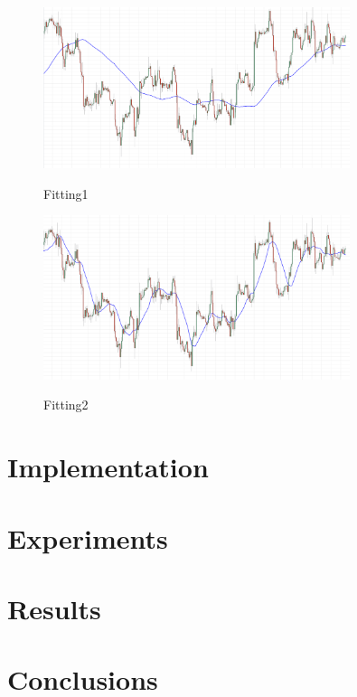 \documentclass[review]{elsarticle}
\begin{document}
\begin{figure}
\caption{Fitting1}
\centering
\includegraphics[width=0.8\textwidth]{img/fitting1.png}
\label{figure:fitting1}
\end{figure}

\begin{figure}
\caption{Fitting2}
\centering
\includegraphics[width=0.8\textwidth]{img/fitting2.png}
\label{figure:fitting2}
\end{figure}

\section{Implementation}
\label{section:implementation}

\section{Experiments}
\label{section:experiments}

\section{Results}
\label{section:results}

\section{Conclusions}
\label{section:conclusions}
\end{document}

